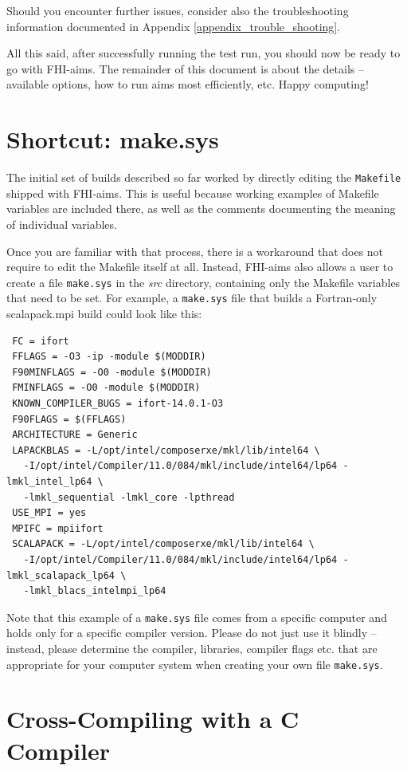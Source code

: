 Should you encounter further issues, consider also the troubleshooting
information documented in Appendix \ref{appendix_trouble_shooting}. 

All this said, after successfully running the test run, you should now be
ready to go with FHI-aims. The remainder of this document is about the details
-- available options, how to run aims most efficiently, etc. Happy computing!


\section{Shortcut: make.sys}

The initial set of builds described so far worked by directly editing
the \texttt{Makefile} shipped with FHI-aims. This is useful because
working examples of Makefile variables are included there, as well as
the comments documenting the meaning of individual variables.

Once you are familiar with that process, there is a workaround that
does not require to edit the Makefile itself at all. Instead,
FHI-aims also allows a user to create a file \texttt{make.sys} in the
\emph{src} directory, containing only the Makefile variables that need
to be set. For example, a \texttt{make.sys} file that builds a
Fortran-only scalapack.mpi build could look like this:

\begin{verbatim}
 FC = ifort
 FFLAGS = -O3 -ip -module $(MODDIR)
 F90MINFLAGS = -O0 -module $(MODDIR)
 FMINFLAGS = -O0 -module $(MODDIR)
 KNOWN_COMPILER_BUGS = ifort-14.0.1-O3
 F90FLAGS = $(FFLAGS)
 ARCHITECTURE = Generic
 LAPACKBLAS = -L/opt/intel/composerxe/mkl/lib/intel64 \
   -I/opt/intel/Compiler/11.0/084/mkl/include/intel64/lp64 -lmkl_intel_lp64 \
   -lmkl_sequential -lmkl_core -lpthread
 USE_MPI = yes
 MPIFC = mpiifort
 SCALAPACK = -L/opt/intel/composerxe/mkl/lib/intel64 \
   -I/opt/intel/Compiler/11.0/084/mkl/include/intel64/lp64 -lmkl_scalapack_lp64 \
   -lmkl_blacs_intelmpi_lp64
\end{verbatim}

Note that this example of a \texttt{make.sys} file comes from a
specific computer and holds only for a specific compiler
version. Please do not just use it blindly -- instead, please
determine the compiler, libraries, compiler flags etc. that are
appropriate for your computer system when creating your own file
\texttt{make.sys}. 

\section{Cross-Compiling with a C Compiler}
\label{cross-compile-c}

